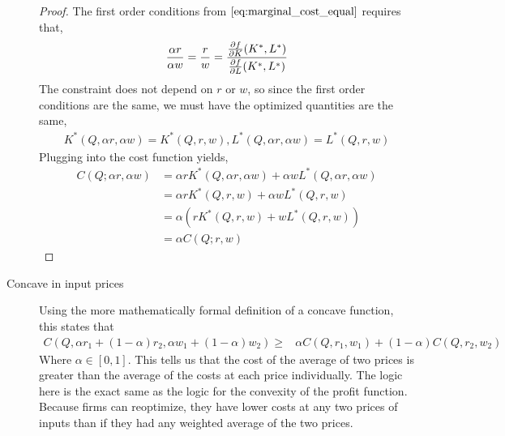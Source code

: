 \begin{description}
    \begin{proof}
        The first order conditions from $\ref{eq:marginal_cost_equal}$ requires that,
        \begin{align*}
            \frac{\alpha r}{\alpha w} = \frac{r}{w} = \frac{\frac{\partial f}{\partial K}(K^*, L^*)}{\frac{\partial f}{\partial L}(K^*, L^*)}
        \end{align*}
        The constraint does not depend on $r$ or $w$, so since the first order conditions are the same, we must have the optimized quantities are the same,
        \begin{align*}
            K^*(Q, \alpha r, \alpha w) = K^*(Q, r, w), L^*(Q, \alpha r, \alpha w) = L^*(Q, r, w)
        \end{align*}
        Plugging into the cost function yields,
        \begin{align*}
            C(Q; \alpha r, \alpha w) &= \alpha rK^*(Q, \alpha r, \alpha w) + \alpha w L^*(Q, \alpha r, \alpha w)\\
            &= \alpha r K^*(Q, r, w) + \alpha w L^*(Q, r, w) \\
            &= \alpha (rK^*(Q, r, w) + w L^*(Q, r, w)) \\
            &= \alpha C(Q; r, w)
        \end{align*}
    \end{proof}
    \item[Concave in input prices] Using the more mathematically formal definition of a concave function, this states that
    \begin{align*}
        C(Q, \alpha r_1 + (1 - \alpha) r_2, \alpha w_1 + (1 - \alpha)w_2) \geq &\alpha C(Q, r_1,  w_1) + (1 - \alpha)C(Q, r_2, w_2)
    \end{align*}
    Where $\alpha \in [0, 1]$. This tells us that the cost of the average of two prices is greater than the average of the costs at each price individually. The logic here is the exact same as the logic for the convexity of the profit function. Because firms can reoptimize, they have lower costs at any two prices of inputs than if they had any weighted average of the two prices. 


\end{description}
